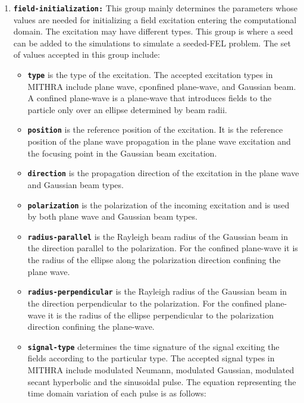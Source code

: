\begin{enumerate}
\item \textbf{\texttt{field-initialization:}} This group mainly determines the parameters whose values are needed for initializing a field excitation entering the computational domain. The excitation may have different types. This group is where a seed can be added to the simulations to simulate a seeded-FEL problem. The set of values accepted in this group include:
\begin{itemize}
	\item \textbf{\texttt{type}} is the type of the excitation. The accepted excitation types in MITHRA include plane wave, cponfined plane-wave, and Gaussian beam. A confined plane-wave is a plane-wave that introduces fields to the particle only over an ellipse determined by beam radii.
	\item \textbf{\texttt{position}} is the reference position of the excitation. It is the reference position of the plane wave propagation in the plane wave excitation and the focusing point in the Gaussian beam excitation.
	\item \textbf{\texttt{direction}} is the propagation direction of the excitation in the plane wave and Gaussian beam types.
	\item \textbf{\texttt{polarization}} is the polarization of the incoming excitation and is used by both plane wave and Gaussian beam types.
	\item \textbf{\texttt{radius-parallel}} is the Rayleigh beam radius of the Gaussian beam in the direction parallel to the polarization. For the confined plane-wave it is the radius of the ellipse along the polarization direction confining the plane wave.
	\item \textbf{\texttt{radius-perpendicular}} is the Rayleigh radius of the Gaussian beam in the direction perpendicular to the polarization. For the confined plane-wave it is the radius of the ellipse perpendicular to the polarization direction confining the plane-wave.
	\item \textbf{\texttt{signal-type}} determines the time signature of the signal exciting the fields according to the particular type. The accepted signal types in MITHRA include modulated Neumann, modulated Gaussian, modulated secant hyperbolic and the sinusoidal pulse. The equation representing the time domain variation of each pulse is as follows:
	\begin{equation}
	\renewcommand{\arraystretch}{1.5}
	\begin{array}{lrcl}

\end{array}
\end{equation}
\end{itemize}
\end{enumerate}
